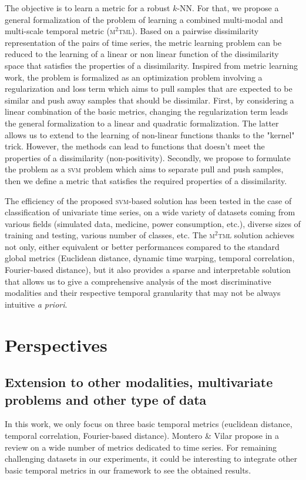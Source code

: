 The objective is to learn a metric for a robust $k$-NN. For that, we propose a general formalization of the problem of learning a combined multi-modal and multi-scale temporal metric (\textsc{m$^2$tml}). Based on a pairwise dissimilarity representation of the pairs of time series, the metric learning problem can be reduced to the learning of a linear or non linear function of the dissimilarity space that satisfies the properties of a dissimilarity. Inspired from metric learning work, the problem is formalized as an optimization problem involving a regularization and loss term which aims to pull samples that are expected to be similar and push away samples that should be dissimilar. First, by considering a linear combination of the basic metrics, changing the regularization term leads the general formalization to a linear and quadratic formalization. The latter allows us to extend to the learning of non-linear functions thanks to the "kernel" trick. However, the methods can lead to functions that doesn't meet the properties of a dissimilarity (non-positivity). Secondly, we propose to formulate the problem as a \textsc{svm} problem which aims to separate pull and push samples, then we define a metric that satisfies the required properties of a dissimilarity. 

The efficiency of the proposed \textsc{svm}-based solution has been tested in the case of classification of univariate time series, on a wide variety of datasets coming from various fields (simulated data, medicine, power consumption, etc.), diverse sizes of training and testing, various number of classes, etc. The \textsc{m$^2$tml} solution achieves not only, either equivalent or better performances compared to the standard global metrics (Euclidean distance, dynamic time warping, temporal correlation, Fourier-based distance), but it also provides a sparse and interpretable solution that allows us to give a comprehensive analysis of the most discriminative modalities and their respective temporal granularity that may not be always intuitive \textit{a priori}. 

\section*{Perspectives}
\subsection*{Extension to other modalities, multivariate problems and other type of data}
In this work, we only focus on three basic temporal metrics (euclidean distance, temporal correlation, Fourier-based distance). Montero \& Vilar propose in \cite{Montero2014} a review on a wide number of metrics dedicated to time series. For remaining challenging datasets in our experiments, it could be interesting to integrate other basic temporal metrics in our framework to see the obtained results.

